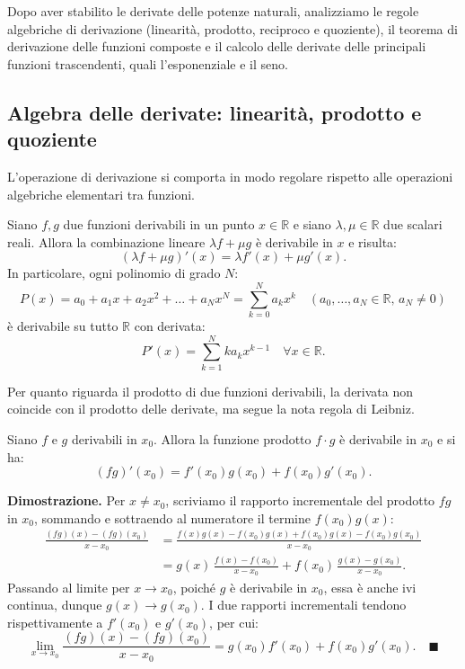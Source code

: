 Dopo aver stabilito le derivate delle potenze naturali, analizziamo le regole algebriche di derivazione (linearità, prodotto, reciproco e quoziente), il teorema di derivazione delle funzioni composte e il calcolo delle derivate delle principali funzioni trascendenti, quali l'esponenziale e il seno.

\subsection{Algebra delle derivate: linearità, prodotto e quoziente}

L'operazione di derivazione si comporta in modo regolare rispetto alle operazioni algebriche elementari tra funzioni.

\begin{propbox}
Siano $f, g$ due funzioni derivabili in un punto $x \in \mathbb{R}$ e siano $\lambda, \mu \in \mathbb{R}$ due scalari reali. Allora la combinazione lineare $\lambda f + \mu g$ è derivabile in $x$ e risulta:
\[
    (\lambda f + \mu g)'(x) = \lambda f'(x) + \mu g'(x).
\]
In particolare, ogni polinomio di grado $N$:
\[
    P(x) = a_0 + a_1 x + a_2 x^2 + \dots + a_N x^N = \sum_{k=0}^{N} a_k x^k \quad (a_0, \dots, a_N \in \mathbb{R}, \, a_N \neq 0)
\]
è derivabile su tutto $\mathbb{R}$ con derivata:
\[
    P'(x) = \sum_{k=1}^{N} k a_k x^{k-1} \quad \forall x \in \mathbb{R}.
\]
\end{propbox}

Per quanto riguarda il prodotto di due funzioni derivabili, la derivata non coincide con il prodotto delle derivate, ma segue la nota regola di Leibniz.

\begin{propbox}
Siano $f$ e $g$ derivabili in $x_0$. Allora la funzione prodotto $f \cdot g$ è derivabile in $x_0$ e si ha:
\[
    (fg)'(x_0) = f'(x_0)g(x_0) + f(x_0)g'(x_0).
\]
\end{propbox}

\noindent\textbf{Dimostrazione.} Per $x \neq x_0$, scriviamo il rapporto incrementale del prodotto $fg$ in $x_0$, sommando e sottraendo al numeratore il termine $f(x_0)g(x)$:
\begin{align*}
    \frac{(fg)(x) - (fg)(x_0)}{x - x_0} &= \frac{f(x)g(x) - f(x_0)g(x) + f(x_0)g(x) - f(x_0)g(x_0)}{x - x_0} \\
    &= g(x)\,\frac{f(x) - f(x_0)}{x - x_0} + f(x_0)\,\frac{g(x) - g(x_0)}{x - x_0}.
\end{align*}
Passando al limite per $x \to x_0$, poiché $g$ è derivabile in $x_0$, essa è anche ivi continua, dunque $g(x) \to g(x_0)$. I due rapporti incrementali tendono rispettivamente a $f'(x_0)$ e $g'(x_0)$, per cui:
\[
    \lim_{x \to x_0} \frac{(fg)(x) - (fg)(x_0)}{x - x_0} = g(x_0)f'(x_0) + f(x_0)g'(x_0). \quad \blacksquare
\]


